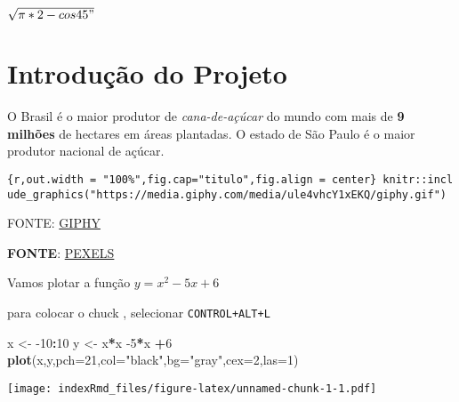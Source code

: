 \documentclass[
]{article}
\newenvironment{Shaded}{\begin{snugshade}}{\end{snugshade}}
\newcommand{\DataTypeTok}[1]{\textcolor[rgb]{0.13,0.29,0.53}{#1}}
\newcommand{\DecValTok}[1]{\textcolor[rgb]{0.00,0.00,0.81}{#1}}
\newcommand{\KeywordTok}[1]{\textcolor[rgb]{0.13,0.29,0.53}{\textbf{#1}}}
\newcommand{\NormalTok}[1]{#1}
\newcommand{\OperatorTok}[1]{\textcolor[rgb]{0.81,0.36,0.00}{\textbf{#1}}}
\newcommand{\StringTok}[1]{\textcolor[rgb]{0.31,0.60,0.02}{#1}}
\begin{document}
\(\sqrt{\pi*2-cos45"}\)

\hypertarget{introduuxe7uxe3o-do-projeto}{%
\section{Introdução do Projeto}\label{introduuxe7uxe3o-do-projeto}}

O Brasil é o maior produtor de \emph{cana-de-açúcar} do mundo com mais
de \textbf{9 milhões} de hectares em áreas plantadas. O estado de São
Paulo é o maior produtor nacional de açúcar.

\texttt{\{r,out.width\ =\ "100\%",fig.cap="titulo",fig.align\ =\ \textquotesingle{}center\textquotesingle{}\}\ knitr::include\_graphics("https://media.giphy.com/media/ule4vhcY1xEKQ/giphy.gif")}

FONTE: \href{https:://giphy.com}{GIPHY}

\textbf{FONTE}: \href{https://www.pexels.com/}{PEXELS}

Vamos plotar a função \(y = x^2- 5x + 6\)

para colocar o chuck , selecionar \texttt{CONTROL+ALT+L}

\begin{Shaded}
\begin{Highlighting}[]
\NormalTok{x <-}\StringTok{ }\DecValTok{-10}\OperatorTok{:}\DecValTok{10}
\NormalTok{y <-}\StringTok{ }\NormalTok{x}\OperatorTok{*}\NormalTok{x }\DecValTok{-5}\OperatorTok{*}\NormalTok{x }\OperatorTok{+}\DecValTok{6}
\KeywordTok{plot}\NormalTok{(x,y,}\DataTypeTok{pch=}\DecValTok{21}\NormalTok{,}\DataTypeTok{col=}\StringTok{"black"}\NormalTok{,}\DataTypeTok{bg=}\StringTok{"gray"}\NormalTok{,}\DataTypeTok{cex=}\DecValTok{2}\NormalTok{,}\DataTypeTok{las=}\DecValTok{1}\NormalTok{)}
\end{Highlighting}
\end{Shaded}

\texttt{[image: indexRmd\_files/figure-latex/unnamed-chunk-1-1.pdf]}
\end{document}
